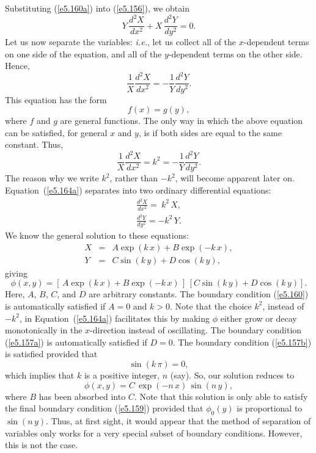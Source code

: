Substituting (\ref{e5.160a})  into (\ref{e5.156}), we obtain
\begin{equation}
Y \,\frac{d^2 X}{d x^2} + X\,\frac{d^2 Y}{d y^2} = 0.
\end{equation}
Let us now separate the variables: {\em i.e.}, let us collect all of the
$x$-dependent terms on one side of the equation, and all of the $y$-dependent
terms on the other side. Hence,
\begin{equation}
\frac{1}{X}\frac{d^2 X}{d x^2} = - \frac{1}{Y} \frac{d^2 Y}{d y^2}.
\end{equation}
This equation has the form
\begin{equation}\label{e5.164}
f(x) = g(y),
\end{equation}
where $f$ and $g$ are general functions. The only way in which the above equation
can be satisfied, for general $x$ and $y$, is if both sides are equal to the
same constant. Thus,
\begin{equation}\label{e5.164a}
\frac{1}{X}\frac{d^2 X}{d x^2} = k^2 =- \frac{1}{Y} \frac{d^2 Y}{d y^2}.
\end{equation}
The reason why we write $k^2$, rather than $-k^2$, will become apparent later on.
Equation~(\ref{e5.164a}) separates into two ordinary differential equations:
\begin{eqnarray}
\frac{d^2 X}{d x^2} =~ k^2\,X,\\[0.5ex]
\frac{d^2 Y}{d y^2} = - k^2\,Y.
\end{eqnarray}
We know the general solution to these equations:
\begin{eqnarray}
X& = &A \exp(k\,x) + B \exp(-k\,x),\\[0.5ex]
Y &=& C \sin (k\,y) + D \cos (k\,y),
\end{eqnarray}
giving
\begin{equation}
\phi(x,y) = [\,A \exp(k\,x) + B \exp(-k\,x)\,]\,[C \sin (k\,y) + D \cos (k\,y)].
\end{equation}
Here, $A$, $B$, $C$, and $D$ are arbitrary constants. The boundary condition
(\ref{e5.160}) is automatically satisfied if $A=0$ and $k>0$. 
Note that the choice $k^2$, instead of
$-k^2$, in Equation~(\ref{e5.164a}) facilitates this by making $\phi$  either grow or decay
monotonically in  the $x$-direction instead of
oscillating.  The boundary condition (\ref{e5.157a})
 is automatically
satisfied if $D=0$. The boundary condition (\ref{e5.157b}) is satisfied provided that
\begin{equation}
\sin (k \,\pi) = 0,
\end{equation}
which implies that  $k$ is a positive integer, $n$ (say). So,
our solution reduces to
\begin{equation}\label{e5.170}
\phi(x, y) = C\, \exp(-n\,x)\,\sin (n\,y),
\end{equation}
where $B$ has been absorbed into $C$. Note that this solution is only able
to satisfy the final boundary condition (\ref{e5.159}) provided that $\phi_0(y)$ is
proportional to $\sin (n\,y)$. Thus, at first sight, it would appear that the method
of separation of variables only works for a very special subset of 
boundary conditions. However, this is not the case.

